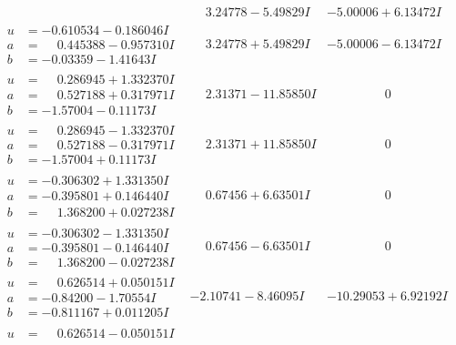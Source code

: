 \documentclass[1p]{elsarticle_modified}
\theoremstyle{definition}
\begin{document}
$$\begin{array}{c|c|c}
 & \phantom{-}3.24778 - 5.49829 I & -5.00006 + 6.13472 I \\ \hline\begin{aligned}
u &= -0.610534 - 0.186046 I \\
a &= \phantom{-}0.445388 - 0.957310 I \\
b &= -0.03359 - 1.41643 I\end{aligned}
 & \phantom{-}3.24778 + 5.49829 I & -5.00006 - 6.13472 I \\ \hline\begin{aligned}
u &= \phantom{-}0.286945 + 1.332370 I \\
a &= \phantom{-}0.527188 + 0.317971 I \\
b &= -1.57004 - 0.11173 I\end{aligned}
 & \phantom{-}2.31371 - 11.85850 I & \phantom{-0.000000 } 0 \\ \hline\begin{aligned}
u &= \phantom{-}0.286945 - 1.332370 I \\
a &= \phantom{-}0.527188 - 0.317971 I \\
b &= -1.57004 + 0.11173 I\end{aligned}
 & \phantom{-}2.31371 + 11.85850 I & \phantom{-0.000000 } 0 \\ \hline\begin{aligned}
u &= -0.306302 + 1.331350 I \\
a &= -0.395801 + 0.146440 I \\
b &= \phantom{-}1.368200 + 0.027238 I\end{aligned}
 & \phantom{-}0.67456 + 6.63501 I & \phantom{-0.000000 } 0 \\ \hline\begin{aligned}
u &= -0.306302 - 1.331350 I \\
a &= -0.395801 - 0.146440 I \\
b &= \phantom{-}1.368200 - 0.027238 I\end{aligned}
 & \phantom{-}0.67456 - 6.63501 I & \phantom{-0.000000 } 0 \\ \hline\begin{aligned}
u &= \phantom{-}0.626514 + 0.050151 I \\
a &= -0.84200 - 1.70554 I \\
b &= -0.811167 + 0.011205 I\end{aligned}
 & -2.10741 - 8.46095 I & -10.29053 + 6.92192 I \\ \hline\begin{aligned}
u &= \phantom{-}0.626514 - 0.050151 I \\

\end{aligned}
\end{array}$$
\end{document}
